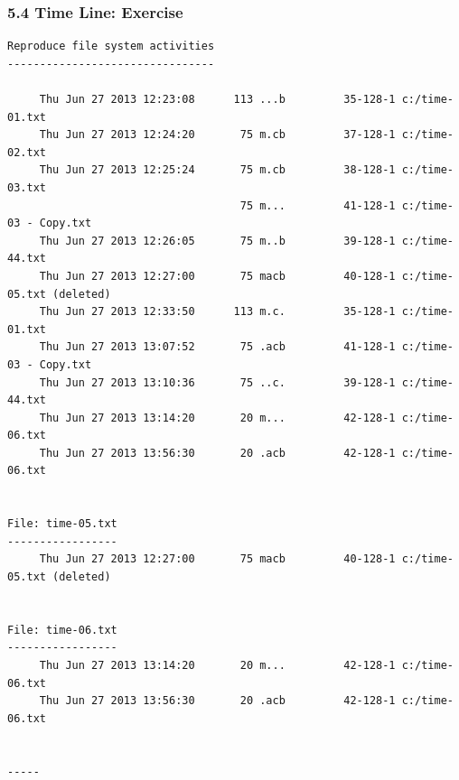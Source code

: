 \begin{frame}[fragile]
  \frametitle{5.4 Time Line: Exercise}
  \begin{lstlisting}[basicstyle=\tiny]
Reproduce file system activities
--------------------------------
  
     Thu Jun 27 2013 12:23:08      113 ...b         35-128-1 c:/time-01.txt
     Thu Jun 27 2013 12:24:20       75 m.cb         37-128-1 c:/time-02.txt
     Thu Jun 27 2013 12:25:24       75 m.cb         38-128-1 c:/time-03.txt
                                    75 m...         41-128-1 c:/time-03 - Copy.txt
     Thu Jun 27 2013 12:26:05       75 m..b         39-128-1 c:/time-44.txt
     Thu Jun 27 2013 12:27:00       75 macb         40-128-1 c:/time-05.txt (deleted)
     Thu Jun 27 2013 12:33:50      113 m.c.         35-128-1 c:/time-01.txt
     Thu Jun 27 2013 13:07:52       75 .acb         41-128-1 c:/time-03 - Copy.txt
     Thu Jun 27 2013 13:10:36       75 ..c.         39-128-1 c:/time-44.txt
     Thu Jun 27 2013 13:14:20       20 m...         42-128-1 c:/time-06.txt
     Thu Jun 27 2013 13:56:30       20 .acb         42-128-1 c:/time-06.txt


File: time-05.txt
-----------------
     Thu Jun 27 2013 12:27:00       75 macb         40-128-1 c:/time-05.txt (deleted)


File: time-06.txt
-----------------
     Thu Jun 27 2013 13:14:20       20 m...         42-128-1 c:/time-06.txt
     Thu Jun 27 2013 13:56:30       20 .acb         42-128-1 c:/time-06.txt


-----
  \end{lstlisting}
\end{frame}



